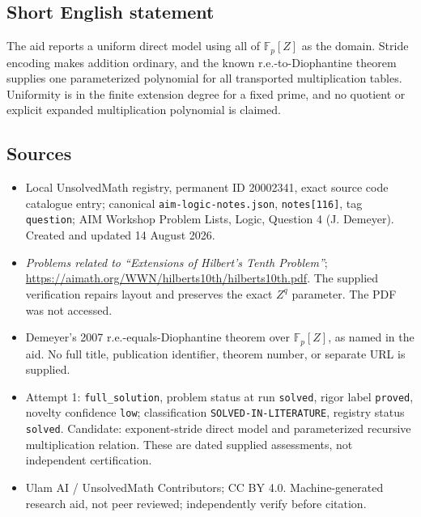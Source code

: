 \documentclass[11pt]{article}
\newcommand{\F}{\mathbb{F}}
\begin{document}
\subsection{Short English statement}
The aid reports a uniform direct model using all of \(\F_p[Z]\) as the domain. Stride encoding makes addition ordinary, and the known r.e.-to-Diophantine theorem supplies one parameterized polynomial for all transported multiplication tables. Uniformity is in the finite extension degree for a fixed prime, and no quotient or explicit expanded multiplication polynomial is claimed.
\subsection{Sources}
\begin{itemize}
\item Local UnsolvedMath registry, permanent ID 20002341, exact source code catalogue entry; canonical \texttt{aim-logic-notes.json}, \texttt{notes[116]}, tag \texttt{question}; AIM Workshop Problem Lists, Logic, Question 4 (J. Demeyer). Created and updated 14 August 2026.
\item \emph{Problems related to ``Extensions of Hilbert's Tenth Problem''}; \url{https://aimath.org/WWN/hilberts10th/hilberts10th.pdf}. The supplied verification repairs layout and preserves the exact \(Z^q\) parameter. The PDF was not accessed.
\item Demeyer's 2007 r.e.-equals-Diophantine theorem over \(\F_p[Z]\), as named in the aid. No full title, publication identifier, theorem number, or separate URL is supplied.
\item Attempt 1: \texttt{full\_solution}, problem status at run \texttt{solved}, rigor label \texttt{proved}, novelty confidence \texttt{low}; classification \texttt{SOLVED-IN-LITERATURE}, registry status \texttt{solved}. Candidate: exponent-stride direct model and parameterized recursive multiplication relation. These are dated supplied assessments, not independent certification.
\item Ulam AI / UnsolvedMath Contributors; CC BY 4.0. Machine-generated research aid, not peer reviewed; independently verify before citation.
\end{itemize}
\end{document}
